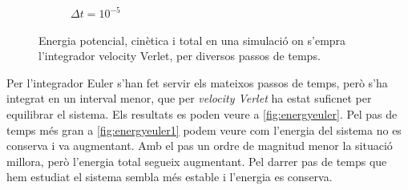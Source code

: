 \documentclass[a4paper,10pt]{article}
\begin{document}
\begin{figure}
\begin{subfigure}{0.45\linewidth}
		\caption{$\Delta t = 10^{-5}$}
		\label{fig:energyverlet3}
	\end{subfigure}
	\caption{Energia potencial, cinètica i total en una simulació on s'empra l'integrador velocity Verlet, per diversos passos de temps.}
	\label{fig:energyverlet}
\end{figure}

Per l'integrador Euler s'han fet servir els mateixos passos de temps, però s'ha integrat en un interval menor, que per \textit{velocity Verlet} ha estat suficnet per equilibrar el sistema. Els resultats es poden veure a \ref{fig:energyeuler}. Pel pas de temps més gran a \ref{fig:energyeuler1} podem veure com l'energia del sistema no es conserva i va augmentant. Amb el pas un ordre de magnitud menor la situació millora, però l'energia total segueix augmentant. Pel darrer pas de temps que hem estudiat el sistema sembla més estable i l'energia es conserva.
\end{document}
